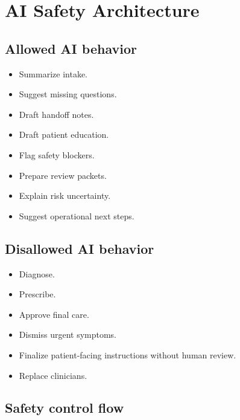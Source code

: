 \documentclass[11pt,letterpaper]{article}
\begin{document}
\section{AI Safety Architecture}

\subsection{Allowed AI behavior}

\begin{itemize}
  \item Summarize intake.
  \item Suggest missing questions.
  \item Draft handoff notes.
  \item Draft patient education.
  \item Flag safety blockers.
  \item Prepare review packets.
  \item Explain risk uncertainty.
  \item Suggest operational next steps.
\end{itemize}

\subsection{Disallowed AI behavior}

\begin{itemize}
  \item Diagnose.
  \item Prescribe.
  \item Approve final care.
  \item Dismiss urgent symptoms.
  \item Finalize patient-facing instructions without human review.
  \item Replace clinicians.
\end{itemize}

\subsection{Safety control flow}
\end{document}
